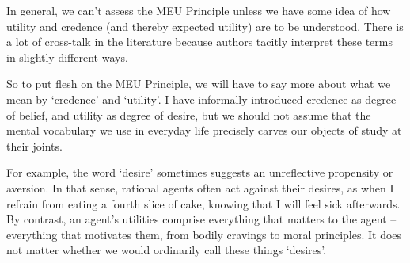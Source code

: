 In general, we can't assess the MEU Principle unless we have some idea
of how utility and credence (and thereby expected utility) are to be
understood. There is a lot of cross-talk in the literature because
authors tacitly interpret these terms in slightly different ways.

So to put flesh on the MEU Principle, we will have to say more about
what we mean by `credence' and `utility'. I have informally introduced
credence as degree of belief, and utility as degree of desire, but we
should not assume that the mental vocabulary we use in everyday life
precisely carves our objects of study at their joints. 

For example, the word `desire' sometimes suggests an unreflective
propensity or aversion. In that sense, rational agents often act
against their desires, as when I refrain from eating a fourth slice of
cake, knowing that I will feel sick afterwards. By contrast, an
agent's utilities comprise everything that matters to the agent --
everything that motivates them, from bodily cravings to moral
principles. It does not matter whether we would ordinarily call these
things `desires'.

